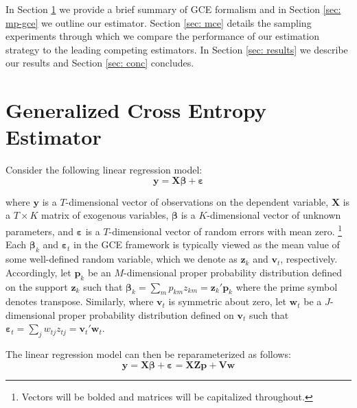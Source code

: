 \documentclass{elsarticle}
\begin{document}
In Section \ref{sec: gce} we provide a brief summary of GCE formalism and 
in Section \ref{sec: mp-gce} we outline our estimator. 
Section \ref{sec: mce} details the sampling experiments through which we 
compare the performance of our estimation strategy to the leading competing 
estimators. 
In Section \ref{sec: results} we describe our results and Section \ref{sec: conc}
concludes.


\section{Generalized Cross Entropy Estimator}
\label{sec: gce}

Consider the following linear regression model: 
\begin{equation}
\mathbf{y} = \mathbf{X\beta} + \mathbf{\varepsilon}
\end{equation}

\noindent
where $\mathbf{y}$ is a $T$-dimensional vector of observations on the 
dependent variable, $\mathbf{X}$ is a $T\times K$ matrix of exogenous
variables, $\mathbf{\beta}$ is a $K$-dimensional vector of unknown 
parameters, and $\mathbf{\varepsilon}$ is a $T$-dimensional vector of 
random errors with mean zero.%
\footnote{Vectors will be bolded and matrices will be capitalized throughout.}
Each $\mathbf{\beta}_k$ and $\mathbf{\varepsilon}_t$ in the GCE 
framework is typically viewed as the mean value of some well-defined 
random variable, which we denote as $\mathbf{z}_k$ and $\mathbf{v}_t$, 
respectively.
Accordingly, let $\mathbf{p}_k$ be an $M$-dimensional proper 
probability distribution defined on the support $\mathbf{z}_k$ such that 
$\mathbf{\beta}_k = \sum_m p_{km}z_{km} = \mathbf{z}_k' 
\mathbf{p}_k$ where the prime symbol denotes transpose.
Similarly, where $\mathbf{v}_t$ is symmetric about zero, let $\mathbf{w}_t$ 
be a $J$-dimensional proper probability distribution defined on $\mathbf{v}_t$ 
such that $\mathbf{\varepsilon}_t = \sum_j w_{tj}z_{tj} = \mathbf{v}_t' 
\mathbf{w}_t$.

The linear regression model can then be reparameterized as follows:
\begin{equation}
\mathbf{y} = \mathbf{X\beta} + \mathbf{\varepsilon} = 
\mathbf{X Z p} + \mathbf{V w}
\label{eq: reparm}
\end{equation}
\end{document}

